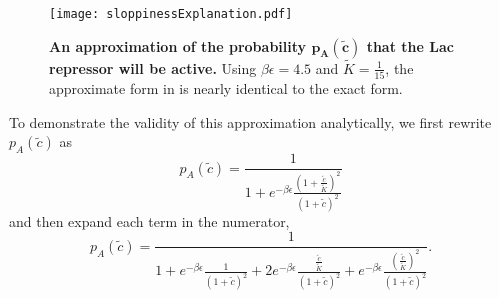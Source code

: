 \begin{figure}[h]
	\centering \texttt{[image: sloppinessExplanation.pdf]} \caption{{\bf An
			approximation of the probability \(\boldsymbol{p_A\left(\tilde{c}\right)}\) that the Lac
			repressor will be active.} Using \(\beta \epsilon =4.5\) and
		\(\tilde{K}=\frac{1}{15}\), the approximate form in \eref[AppendixEqSloppiness]
		is nearly identical to the exact form.} \label{SIfigSloppiness}
\end{figure}

To demonstrate the validity of this approximation analytically, we first rewrite \(p_A\left(\tilde{c}\right)\) as 
\begin{equation}
p_A\left(\tilde{c}\right)=\frac{1}{1+e^{-\beta \epsilon }\frac{\left(1+\frac{\tilde{c}}{\tilde{K}}\right)^2}{\left(1+\tilde{c}\right)^2}}
\end{equation}
and then expand each term in the numerator,
\begin{equation}
p_A\left(\tilde{c}\right)=\frac{1}{1+e^{-\beta \epsilon }\frac{1}{\left(1+\tilde{c}\right)^2}+2e^{-\beta \epsilon }\frac{\frac{\tilde{c}}{\tilde{K}}}{\left(1+\tilde{c}\right)^2}+e^{-\beta
		\epsilon }\frac{\left(\frac{\tilde{c}}{\tilde{K}}\right)^2}{\left(1+\tilde{c}\right)^2}}.
\end{equation}

